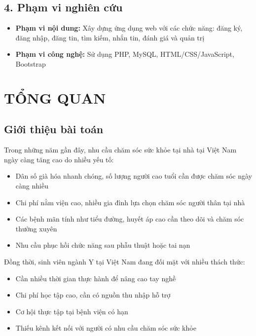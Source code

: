 \documentclass[12pt,a4paper]{report}
\begin{document}
\section*{4. Phạm vi nghiên cứu}

\begin{itemize}
    \item \textbf{Phạm vi nội dung:} Xây dựng ứng dụng web với các chức năng: đăng ký, đăng nhập, đăng tin, tìm kiếm, nhắn tin, đánh giá và quản trị
    \item \textbf{Phạm vi công nghệ:} Sử dụng PHP, MySQL, HTML/CSS/JavaScript, Bootstrap
\end{itemize}

\newpage

\chapter{TỔNG QUAN}

\section{Giới thiệu bài toán}

Trong những năm gần đây, nhu cầu chăm sóc sức khỏe tại nhà tại Việt Nam ngày càng tăng cao do nhiều yếu tố:

\begin{itemize}
    \item Dân số già hóa nhanh chóng, số lượng người cao tuổi cần được chăm sóc ngày càng nhiều
    \item Chi phí nằm viện cao, nhiều gia đình lựa chọn chăm sóc người thân tại nhà
    \item Các bệnh mãn tính như tiểu đường, huyết áp cao cần theo dõi và chăm sóc thường xuyên
    \item Nhu cầu phục hồi chức năng sau phẫu thuật hoặc tai nạn
\end{itemize}

Đồng thời, sinh viên ngành Y tại Việt Nam đang đối mặt với nhiều thách thức:

\begin{itemize}
    \item Cần nhiều thời gian thực hành để nâng cao tay nghề
    \item Chi phí học tập cao, cần có nguồn thu nhập hỗ trợ
    \item Cơ hội thực tập tại bệnh viện có hạn
    \item Thiếu kênh kết nối với người có nhu cầu chăm sóc sức khỏe
\end{itemize}
\end{document}
